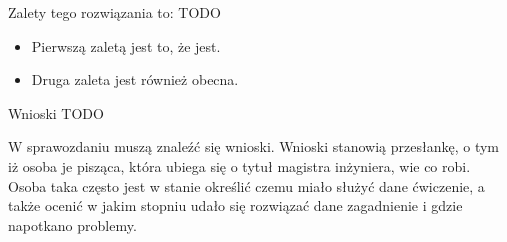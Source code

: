 \documentclass[a4paper,12pt]{article}
\newenvironment{lista}{
\begin{itemize}
  \setlength{\itemsep}{1pt}
  \setlength{\parskip}{0pt}
  \setlength{\parsep}{0pt}
}{\end{itemize}}
\begin{document}
Zalety tego rozwiązania to: TODO
\begin{lista}
 \item Pierwszą zaletą jest to, że jest.
 \item Druga zaleta jest również obecna.
\end{lista}

Wnioski
TODO

W sprawozdaniu muszą znaleźć się wnioski. Wnioski stanowią przesłankę, o tym iż osoba je pisząca, która ubiega się o tytuł magistra inżyniera, wie co robi. Osoba taka często jest w stanie określić czemu miało służyć dane ćwiczenie, a także ocenić w jakim stopniu udało się rozwiązać dane zagadnienie i gdzie napotkano problemy.
\end{document}
